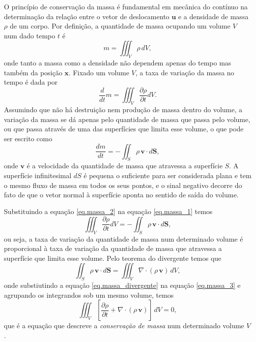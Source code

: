 O princ\'ipio de conserva\c{c}\~ao da massa \'e fundamental em mec\^anica do cont\'inuo na determina\c{c}\~ao da rela\c{c}\~ao entre o vetor de deslocamento $\mathbf{u}$ e a densidade de massa $\rho$ de um corpo. Por defini\c{c}\~ao, a quantidade de massa ocupando um volume $V$  num dado tempo $t$ \'e
\begin{equation*}
m=\iiint_V\rho\,dV,
\end{equation*}
onde tanto a massa como a densidade n\~ao dependem apenas do tempo mas tamb\'em da posi\c{c}\~ao $\mathbf{x}$. Fixado um volume $V$, a taxa de varia\c{c}\~ao da massa no tempo \'e dada por
\begin{equation}\label{eq.massa_1}
\frac{d}{dt}m=\iiint_V\frac{\partial\rho}{\partial t}dV.
\end{equation}
Assumindo que n\~ao h\'a destrui\c{c}\~ao nem produ\c{c}\~ao de massa dentro do volume, a varia\c{c}\~ao da massa se d\'a apenas pelo quantidade de massa que passa pelo volume, ou que passa atrav\'es de uma das superf\'icies que limita esse volume, o que pode ser escrito como
\begin{equation}\label{eq.massa_2}
\frac{dm}{dt}=-\iint_S\rho\,\mathbf{v}\cdot d\mathbf{S},
\end{equation}
onde $\mathbf{v}$ \'e a velocidade da quantidade de massa que atravessa a superf\'icie $S$. A superf\'icie infinitesimal $dS$ \'e pequena o suficiente para ser considerada plana e tem o mesmo fluxo de massa em todos os seus pontos, e o sinal negativo decorre do fato de que o vetor normal \`a superf\'icie aponta no sentido de sa\'ida do volume. 

Substituindo a equa\c{c}\~ao \ref{eq.massa_2} na equa\c{c}\~ao \ref{eq.massa_1} temos
\begin{equation}\label{eq.massa_3}
\iiint_V\frac{\partial\rho}{\partial t}dV=-\iint_S\rho\,\mathbf{v}\cdot d\mathbf{S},
\end{equation}
ou seja, a taxa de varia\c{c}\~ao da quantidade de massa num determinado volume \'e proporcional \`a taxa de varia\c{c}\~ao da quantidade de massa que atravessa a superf\'icie que limita esse volume. Pelo teorema do divergente temos que
\begin{equation}\label{eq.massa_divergente}
\iint_S\rho\,\mathbf{v}\cdot d\mathbf{S}=\iiint_V\nabla\cdot (\rho\,\mathbf{v})\,dV,
\end{equation}
onde substiutindo a equa\c{c}\~ao \ref{eq.massa_divergente} na equa\c{c}\~ao \ref{eq.massa_3} e agrupando os integrandos sob um mesmo volume, temos
\begin{equation*}
\iiint_V\left[\frac{\partial\rho}{\partial t}+\nabla\cdot (\rho\,\mathbf{v})\right]\,dV=0,
\end{equation*}
que \'e a equa\c{c}\~ao que descreve a \textit{conserva\c{c}\~ao de massa} num determinado volume $V$.

